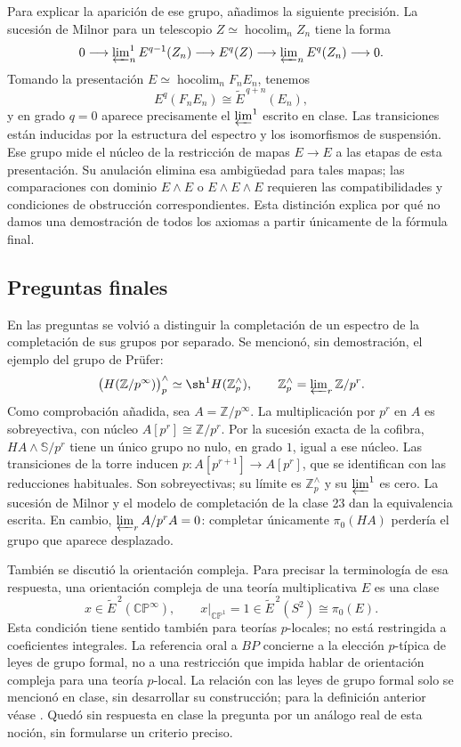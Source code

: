 Para explicar la aparición de ese grupo, añadimos la siguiente precisión. La sucesión de Milnor para un telescopio $Z\simeq\operatorname*{hocolim}_n Z_n$ tiene la forma
\[
0\longrightarrow\varprojlim\nolimits_n^{1}E^{q-1}(Z_n)
\longrightarrow E^q(Z)
\longrightarrow\varprojlim\nolimits_n E^q(Z_n)
\longrightarrow0.
\]
Tomando la presentación $E\simeq\operatorname*{hocolim}_nF_nE_n$, tenemos
\[
E^q(F_nE_n)\cong\widetilde E^{\,q+n}(E_n),
\]
y en grado $q=0$ aparece precisamente el $\varprojlim^{1}$ escrito en clase. Las transiciones están inducidas por la estructura del espectro y los isomorfismos de suspensión. Ese grupo mide el núcleo de la restricción de mapas $E\to E$ a las etapas de esta presentación. Su anulación elimina esa ambigüedad para tales mapas; las comparaciones con dominio $E\wedge E$ o $E\wedge E\wedge E$ requieren las compatibilidades y condiciones de obstrucción correspondientes. Esta distinción explica por qué no damos una demostración de todos los axiomas a partir únicamente de la fórmula final.

\subsection{Preguntas finales}
En las preguntas se volvió a distinguir la completación de un espectro de la completación de sus grupos por separado. Se mencionó, sin demostración, el ejemplo del grupo de Prüfer:
\[
\bigl(H(\mathbb Z/p^\infty)\bigr)_p^\wedge
\simeq\sh^1H(\mathbb Z_p^\wedge),
\qquad \mathbb Z_p^\wedge=\varprojlim\nolimits_r\mathbb Z/p^r.
\]
Como comprobación añadida, sea $A=\mathbb Z/p^\infty$. La multiplicación por $p^r$ en $A$ es sobreyectiva, con núcleo $A[p^r]\cong\mathbb Z/p^r$. Por la sucesión exacta de la cofibra, $HA\wedge\mathbb S/p^r$ tiene un único grupo no nulo, en grado $1$, igual a ese núcleo. Las transiciones de la torre inducen $p\colon A[p^{r+1}]\to A[p^r]$, que se identifican con las reducciones habituales. Son sobreyectivas; su límite es $\mathbb Z_p^\wedge$ y su $\varprojlim^1$ es cero. La sucesión de Milnor y el modelo de completación de la clase 23 dan la equivalencia escrita. En cambio, $\varprojlim_r A/p^rA=0$: completar únicamente $\pi_0(HA)$ perdería el grupo que aparece desplazado.

También se discutió la orientación compleja. Para precisar la terminología de esa respuesta, una orientación compleja de una teoría multiplicativa $E$ es una clase
\[
x\in\widetilde E^{\,2}(\mathbb{CP}^{\infty}),
\qquad
x|_{\mathbb{CP}^1}=1\in\widetilde E^{\,2}(S^2)\cong\pi_0(E).
\]
Esta condición tiene sentido también para teorías $p$-locales; no está restringida a coeficientes integrales. La referencia oral a $BP$ concierne a la elección $p$-típica de leyes de grupo formal, no a una restricción que impida hablar de orientación compleja para una teoría $p$-local. La relación con las leyes de grupo formal solo se mencionó en clase, sin desarrollar su construcción; para la definición anterior véase \cite[lección~4, p.~1]{lurie2010chromatic}. Quedó sin respuesta en clase la pregunta por un análogo real de esta noción, sin formularse un criterio preciso.
